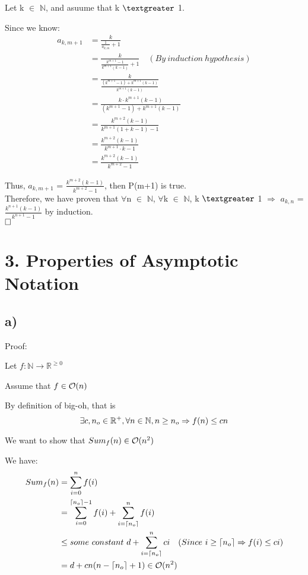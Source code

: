 \documentclass[12pt]{article}
\begin{document}
Let k $\in$ $\mathbb{N}$, and asuume that k $\textgreater$ 1.

Since we know:
\begin{align*}
a_{k,m+1} &= \frac{k}{\frac{1}{a_{k,m}}+1} \\
&= \frac{k}{\frac{k^{m+1}-1}{k^{m+1}(k-1)}+1} \quad (By \ induction \ hypothesis) \\
&= \frac{k}{\frac{(k^{m+1}-1)+k^{m+1}(k-1)}{k^{m+1}(k-1)}} \\
&= \frac{k\cdot k^{m+1}(k-1)}{(k^{m+1}-1)+k^{m+1}(k-1)} \\
&= \frac{k^{m+2}(k-1)}{k^{m+1}(1+k-1)-1} \\
&= \frac{k^{m+2}(k-1)}{k^{m+1}\cdot k-1} \\
&= \frac{k^{m+2}(k-1)}{k^{m+2} - 1}
\end{align*}

Thus, $a_{k,m+1}$ = $\frac{k^{m+2}(k-1)}{k^{m+2} - 1}$, then P(m+1) is true.\\
Therefore, we have proven that $\forall$n $\in$ $\mathbb{N}$, $\forall$k $\in$ $\mathbb{N}$, k $\textgreater$ 1 $\Rightarrow$ $a_{k,n}$ = $\frac{k^{n+1}(k-1)}{k^{n+1} - 1}$ by induction.\\

$\hfill\square$

\newpage

\section*{3. Properties of Asymptotic Notation}
\vspace{20pt}
\subsection*{a)}

Proof:

Let $f: \mathbb{N} \rightarrow \mathbb{R}^{\geq 0}$

Assume that $f \in \mathcal O (n)$

By definition of big-oh, that is
\[ \exists c, n_{o} \in \mathbb{R}^{+}, \forall n \in \mathbb{N}, n \geq n_{o} \Rightarrow f(n) \leq cn \]

We want to show that $Sum_{f}(n) \in \mathcal O (n^2)$

We have:
\begin{align*}
Sum_{f}(n) &= \sum_{i=0}^{n} f(i) \\
&= \sum_{i=0}^{\lceil n_{o}\rceil - 1} f(i) + \sum_{i=\lceil n_{o}\rceil}^{n} f(i) \\
&\leq some \ constant \ d + \sum_{i=\lceil n_{o}\rceil}^{n} ci \quad (Since \ i \geq \lceil n_{o}\rceil \Rightarrow f(i) \leq ci) \\
&= d + cn(n - \lceil n_{o}\rceil + 1) \in \mathcal O (n^2)
\end{align*}
\end{document}

